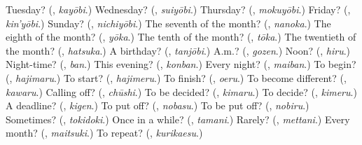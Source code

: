 \begin{tcolorbox}[breakable,colback=teal!4,colframe=teal!35!black,title={Before you move on}]
Tuesday? (\textbf{}, \emph{kayōbi}.) Wednesday? (\textbf{}, \emph{suiyōbi}.) Thursday? (\textbf{}, \emph{mokuyōbi}.) Friday? (\textbf{}, \emph{kin'yōbi}.) Sunday? (\textbf{}, \emph{nichiyōbi}.) The seventh of the month? (\textbf{}, \emph{nanoka}.) The eighth of the month? (\textbf{}, \emph{yōka}.) The tenth of the month? (\textbf{}, \emph{tōka}.) The twentieth of the month? (\textbf{}, \emph{hatsuka}.) A birthday? (\textbf{}, \emph{tanjōbi}.) A.m.? (\textbf{}, \emph{gozen}.) Noon? (\textbf{}, \emph{hiru}.) Night-time? (\textbf{}, \emph{ban}.) This evening? (\textbf{}, \emph{konban}.) Every night? (\textbf{}, \emph{maiban}.) To begin? (\textbf{}, \emph{hajimaru}.) To start? (\textbf{}, \emph{hajimeru}.) To finish? (\textbf{}, \emph{oeru}.) To become different? (\textbf{}, \emph{kawaru}.) Calling off? (\textbf{}, \emph{chūshi}.) To be decided? (\textbf{}, \emph{kimaru}.) To decide? (\textbf{}, \emph{kimeru}.) A deadline? (\textbf{}, \emph{kigen}.) To put off? (\textbf{}, \emph{nobasu}.) To be put off? (\textbf{}, \emph{nobiru}.) Sometimes? (\textbf{}, \emph{tokidoki}.) Once in a while? (\textbf{}, \emph{tamani}.) Rarely? (\textbf{}, \emph{mettani}.) Every month? (\textbf{}, \emph{maitsuki}.) To repeat? (\textbf{}, \emph{kurikaesu}.)
\end{tcolorbox}
